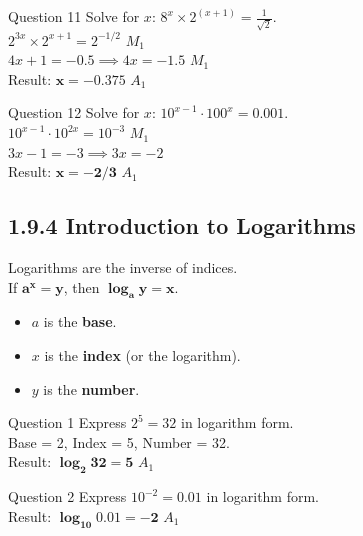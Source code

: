 \documentclass[12pt, a4paper, oneside]{article}
\begin{document}
\begin{solvingbox}{Question 11}
Solve for $x$: $8^{x} \times 2^{(x+1)} = \frac{1}{\sqrt{2}}$. \\
$2^{3x} \times 2^{x+1} = 2^{-1/2}$ \hfill $M_1$ \\
$4x + 1 = -0.5 \implies 4x = -1.5$ \hfill $M_1$ \\
Result: $\mathbf{x = -0.375}$ \hfill $A_1$
\end{solvingbox}

\begin{solvingbox}{Question 12}
Solve for $x$: $10^{x-1} \cdot 100^{x} = 0.001$. \\
$10^{x-1} \cdot 10^{2x} = 10^{-3}$ \hfill $M_1$ \\
$3x - 1 = -3 \implies 3x = -2$ \\
Result: $\mathbf{x = -2/3}$ \hfill $A_1$
\end{solvingbox}

\subsection*{1.9.4 Introduction to Logarithms}

\begin{tcolorbox}[colback=lightgrey, colframe=primaryblue, title=\textbf{Relationship between Indices and Logarithms}, arc=5pt]
    Logarithms are the inverse of indices. \\
    If $\mathbf{a^x = y}$, then $\mathbf{\log_a y = x}$.
    \begin{itemize}
        \item $a$ is the \textbf{base}.
        \item $x$ is the \textbf{index} (or the logarithm).
        \item $y$ is the \textbf{number}.
    \end{itemize}
\end{tcolorbox}

\begin{solvingbox}{Question 1}
Express \textbf{$2^5 = 32$} in logarithm form. \\
Base = 2, Index = 5, Number = 32. \\
Result: $\mathbf{\log_2 32 = 5}$ \hfill $A_1$
\end{solvingbox}

\begin{solvingbox}{Question 2}
Express \textbf{$10^{-2} = 0.01$} in logarithm form. \\
Result: $\mathbf{\log_{10} 0.01 = -2}$ \hfill $A_1$
\end{solvingbox}
\end{document}
